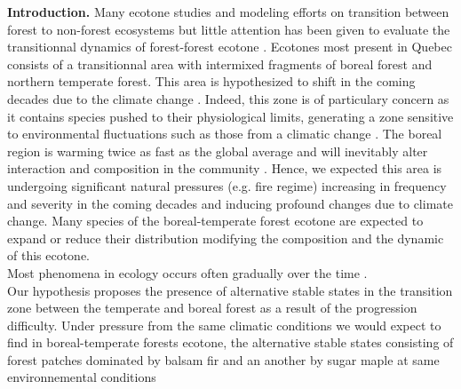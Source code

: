 


\newpage
\setcounter{page}{1}
\textbf{Introduction.} Many ecotone studies and modeling efforts on transition between forest to non-forest ecosystems \cite{Scheffer2012,Scheffer2001,Hirota2011} but little attention has been given to evaluate the transitionnal dynamics of forest-forest ecotone \cite{Goldblum2010,Graignic2013}. Ecotones most present in Quebec consists of a transitionnal area with intermixed fragments of boreal forest and northern temperate forest\cite{Goldblum2010}. This area is hypothesized to shift in the coming decades due to the climate change \cite{Scheffer2012}. Indeed, this zone is of particulary concern as it contains species pushed to their physiological limits, generating a zone sensitive to environmental fluctuations such as those from a climatic change \cite{Messaoud2007,Goldblum2010}. The boreal region is warming twice as fast as the global average and will inevitably alter interaction and composition in the community \cite{Scheffer2012,Hughes2000}. Hence, we expected  this area is undergoing significant natural pressures (e.g. fire regime) increasing in frequency and severity in the coming decades and inducing profound changes due to climate change. Many species of the boreal-temperate forest ecotone are expected to expand or reduce their distribution \cite{Graignic2013,Goldblum2005,Hughes2000} modifying the composition and the dynamic of this ecotone.\\

Most phenomena in ecology occurs often gradually over the time \cite{Scheffer2001}.\\

Our hypothesis proposes the presence of alternative stable states in the transition zone between the temperate and boreal forest as a result of the progression difficulty. Under pressure from the same climatic conditions we would expect to find in boreal-temperate forests ecotone, the alternative stable states consisting of forest patches dominated by balsam fir and an another by sugar maple at same environnemental conditions\\ %

